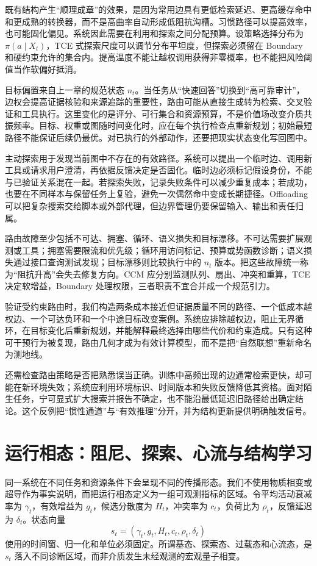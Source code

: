 既有结构产生“顺理成章”的效果，是因为常用边具有更低检索延迟、更高缓存命中和更成熟的转换器，而不是高曲率自动形成低阻抗沟槽。习惯路径可以提高效率，也可能固化偏见。系统因此需要在利用和探索之间分配预算。设策略选择分布为 $\pi(a\mid X_t)$，TCE 式探索尺度可以调节分布平坦度，但探索必须留在 Boundary 和硬约束允许的集合内。提高温度不能让越权调用获得非零概率，也不能把风险阈值当作软偏好抵消。

目标偏置来自上一章的规范状态 $n_t$。当任务从“快速回答”切换到“高可靠审计”，边权会提高证据核验和来源追踪的重要性，路由可能从直接生成转为检索、交叉验证和工具执行。这里变化的是评分、可行集合和资源预算，不是价值场改变介质共振频率。目标、权重或图随时间变化时，应在每个执行检查点重新规划；初始最短路径不能保证后续仍最优。对已执行的外部动作，还要把现实状态变化写回图中。

主动探索用于发现当前图中不存在的有效路径。系统可以提出一个临时边、调用新工具或请求用户澄清，再依据反馈决定是否固化。临时边必须标记假设身份，不能与已验证关系混在一起。若探索失败，记录失败条件可以减少重复成本；若成功，也要在不同样本与保留任务上复验，避免一次偶然命中变成长期捷径。Offloading 可以把复杂搜索交给脚本或外部代理，但边界管理仍要保留输入、输出和责任归属。

路由故障至少包括不可达、拥塞、循环、语义损失和目标漂移。不可达需要扩展观测或工具；拥塞需要限流和优先级；循环用访问标记、预算或势函数诊断；语义损失通过接口查询测试发现；目标漂移则比较执行中的 $n_t$ 版本。把这些故障统一称为“阻抗升高”会失去修复方向。CCM 应分别监测队列、扇出、冲突和重算，TCE 决定软增益，Boundary 处理权限，三者职责不宜合并成一个规范引力。

验证受约束路由时，我们构造两条成本接近但证据质量不同的路径、一个低成本越权边、一个可达负环和一个中途目标改变案例。系统应排除越权边，阻止无界循环，在目标变化后重新规划，并能解释最终选择由哪些代价和约束造成。只有这种可干预行为被复现，路由几何才成为有效计算模型，而不是把“自然联想”重新命名为测地线。

还需检查路由策略是否把熟悉误当正确。训练中高频出现的边通常检索更快，却可能在新环境失效；系统应利用环境标识、时间版本和失败反馈降低其资格。面对陌生任务，宁可显式扩大搜索并报告不确定，也不能沿最低延迟旧路径给出确定结论。这个反例把“惯性通道”与“有效推理”分开，并为结构更新提供明确触发信号。

\section{运行相态：阻尼、探索、心流与结构学习}
\label{sec:rheological_phases}

同一系统在不同任务和资源条件下会呈现不同的传播形态。我们不使用物质相变或超导作为事实说明，而把运行相态定义为一组可观测指标的区域。令平均活动衰减率为 $\gamma_t$，有效增益为 $g_t$，候选分散度为 $H_t$，冲突率为 $c_t$，负荷比为 $\rho_t$，反馈延迟为 $\delta_t$。状态向量
\begin{equation}
s_t=(\gamma_t,g_t,H_t,c_t,\rho_t,\delta_t)
\end{equation}
使用的时间窗、归一化和单位必须固定。所谓基态、探索态、过载态和心流态，是 $s_t$ 落入不同诊断区域，而非介质发生未经观测的宏观量子相变。


